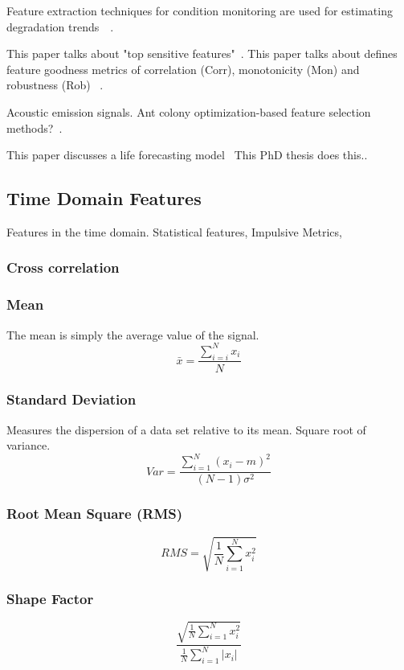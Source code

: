 \documentclass{article}
\begin{document}
Feature extraction techniques for condition monitoring are used for estimating degradation trends~\cite{caesarendra2017review}~\cite{adams2017comparison}.

This paper talks about "top sensitive features"~\cite{bleakie2013feature}.
This paper talks about defines feature goodness metrics of correlation (Corr), monotonicity (Mon) and robustness (Rob) ~\cite{zhang2016degradation}.

Acoustic emission signals. Ant colony optimization-based feature selection methods?~\cite{liao2010feature}.

This paper discusses a life forecasting model~\cite{wang2016multiple}
This PhD thesis does this..~\cite{martin2017unsupervised}

\subsection{Time Domain Features} 	
Features in the time domain. Statistical features, Impulsive Metrics, 
\subsubsection{Cross correlation}
\subsubsection{Mean}
The mean is simply the average value of the signal.
$$ \bar{x} = \frac{\sum^N_{i=i} x_i}{N} $$
\subsubsection{Standard Deviation}  
Measures the dispersion of a data set relative to its mean. Square root of variance.
$$ Var =\frac{\sum^N_{i=1}(x_i-m)^2}{(N-1)\sigma^2} $$
\subsubsection{Root Mean Square (RMS)}

$$ RMS = \sqrt{\frac{1}{N} \sum^N_{i=1}x^2_i} $$
\subsubsection{Shape Factor}

$$ \frac{ \sqrt{\frac{1}{N} \sum^N_{i=1}x_i^2} }  {\frac{1}{N}\sum^N_{i=1}|x_i|} $$
\end{document}
